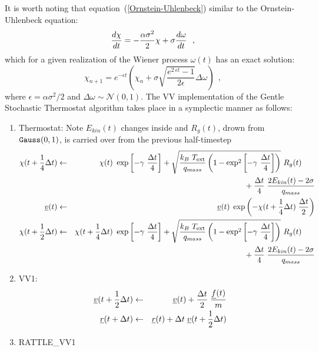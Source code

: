 It is worth noting that equation~(\ref{Ornstein-Uhlenbeck}) similar
to the Ornstein-Uhlenbeck equation:
\begin{equation}
{d \chi \over dt} = -\frac{\alpha\sigma^{2}}{2}\chi + \sigma {d \omega \over dt}~~,
\end{equation}
which for a given realization of the Wiener process $\omega(t)$ has
an exact solution:
\begin{equation}
\chi_{n+1} = e^{-\epsilon t} \left( \chi_{n} + \sigma
\sqrt{\frac{e^{2~\epsilon t} - 1}{2 \epsilon}} \Delta \omega \right)~~,
\end{equation}
where $\epsilon = \alpha\sigma^{2}/2$ and $\Delta \omega \sim \mathcal{N}(0,1)$.
The VV implementation of the Gentle Stochastic Thermostat algorithm
takes place in a symplectic manner as follows:
\begin{enumerate}
\item Thermostat: Note $E_{kin}(t)$ changes inside and $R_{g}(t)$, drown from ${\tt Gauss}(0,1)$, is carried over from the previous half-timestep
\begin{eqnarray}
\chi (t + {1 \over 4} \Delta t) &\leftarrow& \chi (t) ~ \exp \left[-\gamma~{\Delta t \over 4} \right] +
\sqrt{\frac{k_{B}~T_{\rm ext}}{q_{mass}}\left(1-\exp^{2} \left[-\gamma~{\Delta t \over 4} \right]\right)}~R_{g}(t) \phantom{xxx} \nonumber \\
& &\phantom{xxxxxxxxxxxxxxxx} + {\Delta t \over 4} \; {{2 E_{kin}(t) - 2 \sigma} \over q_{mass}} \nonumber \\
\mbox{$\underline{v}$}(t) &\leftarrow& \mbox{$\underline{v}$}(t) \; \exp \left(
-\chi (t + {1 \over 4} \Delta t) \; {\Delta t \over 2} \right) \\
\chi (t + {1 \over 2} \Delta t) &\leftarrow& \chi (t + {1 \over 4} \Delta t) ~ \exp \left[-\gamma~{\Delta t \over 4} \right] +
\sqrt{\frac{k_{B}~T_{\rm ext}}{q_{mass}}\left(1-\exp^{2} \left[-\gamma~{\Delta t \over 4} \right]\right)}~R_{g}(t) \phantom{xxx} \nonumber \\
& &\phantom{xxxxxxxxxxxxxxxx} + {\Delta t \over 4} \; {{2 E_{kin}(t) - 2 \sigma} \over q_{mass}} \nonumber
\end{eqnarray}
\item VV1:
\begin{eqnarray}
\mbox{$\underline{v}$}(t + {1 \over 2} \Delta t) &\leftarrow& \mbox{$\underline{v}$}(t) +
{\Delta t \over 2} \; {\mbox{$\underline{f}$}(t) \over m} \nonumber \\
\mbox{$\underline{r}$}(t + \Delta t) &\leftarrow& \mbox{$\underline{r}$}(t) + \Delta t \;
\mbox{$\underline{v}$}(t + {1 \over 2} \Delta t)
\end{eqnarray}
\item RATTLE\_VV1

\end{enumerate}
